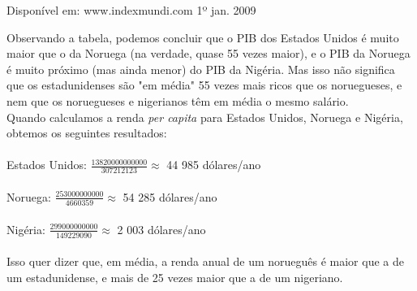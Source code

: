 \documentclass[a4paper,14pt]{article}
\begin{document}
	\begin{flushright}Disponível em: www.indexmundi.com  1º jan. 2009 \end{flushright}
	\noindent Observando a tabela, podemos concluir que o PIB dos Estados Unidos é muito maior que o da Noruega (na verdade, quase 55 vezes maior), e o PIB da Noruega é muito próximo (mas ainda menor) do PIB da Nigéria. Mas isso não significa que os estadunidenses são "em média" 55 vezes mais ricos que os noruegueses, e nem que os noruegueses e nigerianos têm em média o mesmo salário. \\
	\noindent Quando calculamos a renda \textit{per capita} para Estados Unidos, Noruega e Nigéria, obtemos os seguintes resultados: \\\\
	Estados Unidos: $\frac {13 820 000 000 000}{307 212 123} \approx$ 44 985 dólares/ano \\\\
	Noruega: $\frac{253 000 000 000}{4 660 359} \approx$ 54 285 dólares/ano \\\\
	Nigéria: $\frac{299 000 000 000}{149 229 090} \approx$ 2 003 dólares/ano \\\\
	Isso quer dizer que, em média, a renda anual de um norueguês é maior que a de um estadunidense, e mais de 25 vezes maior que a de um nigeriano.
\end{document}
